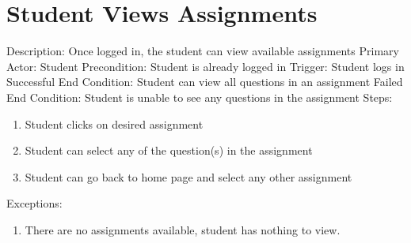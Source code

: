     \section{Student Views Assignments}
        Description: Once logged in, the student can view available assignments \newline
        Primary Actor: Student \newline
        Precondition: Student is already logged in \newline
        Trigger: Student logs in \newline
        Successful End Condition: Student can view all questions in an assignment \newline
        Failed End Condition: Student is unable to see any questions in the assignment \newline
        \newline
        Steps:
        \begin{enumerate}
            \item{Student clicks on desired assignment}
            \item{Student can select any of the question(s) in the assignment}
            \item{Student can go back to home page and select any other assignment}
        \end{enumerate}
        Exceptions:
        \begin{enumerate}
            \item{There are no assignments available, student has nothing to view.}
        \end{enumerate}
    
    
